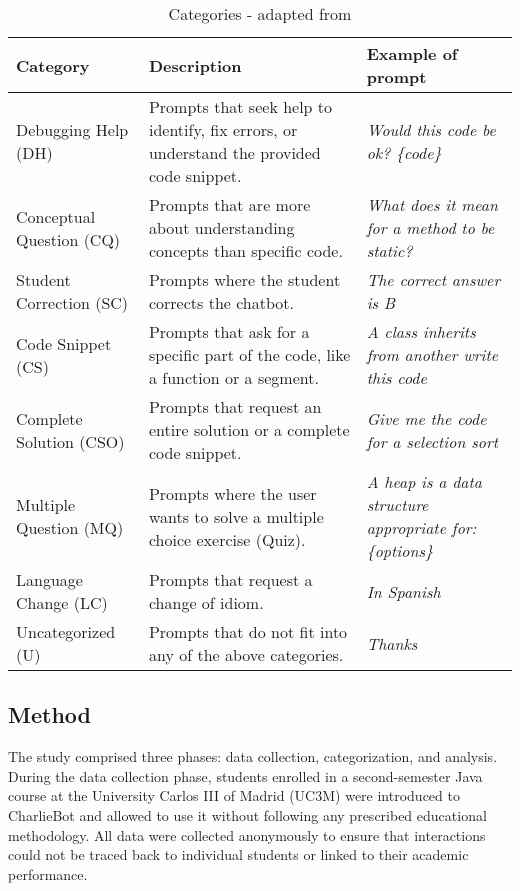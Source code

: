 \documentclass[sn-apa]{sn-jnl} %
\begin{document}
\begin{table*}[htbp]
  \caption{Categories - adapted from \cite{Ghimire24}}
  \begin{center}
    \renewcommand{\arraystretch}{1.2} %
    \begin{tabular}{p{4.1cm} p{4cm} p{3.7cm}} %
      \hline
      \textbf{Category} & \textbf{Description} & \textbf{Example of prompt} \\
      \hline
      Debugging Help (DH) & Prompts that seek help to identify, fix errors, or understand the provided code snippet. & \textit{Would this code be ok? \{code\}} \\
      Conceptual Question (CQ) & Prompts that are more about understanding concepts than specific code. & \textit{What does it mean for a method to be static?} \\
      Student Correction (SC) & Prompts where the student corrects the chatbot. & \textit{The correct answer is B} \\
      Code Snippet  (CS) & Prompts that ask for a specific part of the code, like a function or a segment. & \textit{A class inherits from another write this code} \\
      Complete Solution (CSO) & Prompts that request an entire solution or a complete code snippet. & \textit{Give me the code for a selection sort} \\
      Multiple Question (MQ) & Prompts where the user wants to solve a multiple choice exercise (Quiz). & \textit{A heap is a data structure appropriate for: \{options\}} \\
      Language Change (LC) & Prompts that request a change of idiom. & \textit{In Spanish} \\
      Uncategorized (U) & Prompts that do not fit into any of the above categories. & \textit{Thanks} \\
      \hline
    \end{tabular}
    \label{tab:categories}
  \end{center}
\end{table*}

\subsection{Method}

The study comprised three phases: data collection, categorization, and analysis.
During the data collection phase, students enrolled in a second-semester Java
course at the University Carlos III of Madrid (UC3M) were introduced to
CharlieBot and allowed to use it without following any prescribed educational
methodology. All data were collected anonymously to ensure that interactions
could not be traced back to individual students or linked to their academic
performance.
\end{document}
